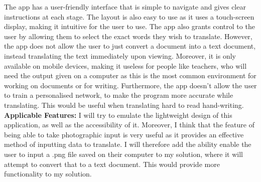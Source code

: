 \documentclass{report}
\begin{document}
\newline
The app has a user-friendly interface that is simple to navigate and gives clear instructions at each stage. The layout is also easy to use as it uses a touch-screen display, making it intuitive for the user to use. The app also grants control to the user by allowing them to select the exact words they wish to translate.
\newline
However, the app does not allow the user to just convert a document into a text document, instead translating the text immediately upon viewing. Moreover, it is only available on mobile devices, making it useless for people like teachers, who will need the output given on a computer as this is the most common environment for working on documents or for writing. Furthermore, the app doesn't allow the user to train a personalised network, to make the program more accurate while translating. This would be useful when translating hard to read hand-writing.
\newline
\newline
\textbf{Applicable Features:}
\newline
I will try to emulate the lightweight design of this application, as well as the accessibility of it. Moreover, I think that the feature of being able to take photographic input is very useful as it provides an effective method of inputting data to translate. I will therefore add the ability enable the user to input a .png file saved on their computer to my solution, where it will attempt to convert that to a text document. This would provide more functionality to my solution. 
\end{document}
